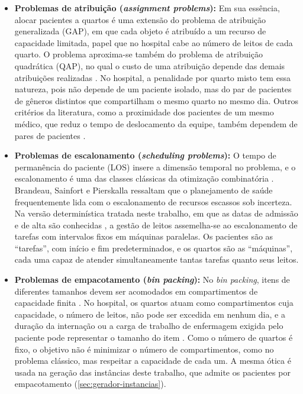 \begin{itemize}
    \item \textbf{Problemas de atribuição (\textit{assignment problems}):} Em sua essência, alocar pacientes a quartos é uma extensão do problema de atribuição generalizada (GAP), em que cada objeto é atribuído a um recurso de capacidade limitada, papel que no hospital cabe ao número de leitos de cada quarto. O problema aproxima-se também do problema de atribuição quadrática (QAP), no qual o custo de uma atribuição depende das demais atribuições realizadas \cite{talbi2009metaheuristics}. No hospital, a penalidade por quarto misto tem essa natureza, pois não depende de um paciente isolado, mas do par de pacientes de gêneros distintos que compartilham o mesmo quarto no mesmo dia. Outros critérios da literatura, como a proximidade dos pacientes de um mesmo médico, que reduz o tempo de deslocamento da equipe, também dependem de pares de pacientes \cite{schafer2023combining}.
    \item \textbf{Problemas de escalonamento (\textit{scheduling problems}):} O tempo de permanência do paciente (LOS) insere a dimensão temporal no problema, e o escalonamento é uma das classes clássicas da otimização combinatória \cite{talbi2009metaheuristics}. Brandeau, Sainfort e Pierskalla \cite{brandeau2004operations} ressaltam que o planejamento de saúde frequentemente lida com o escalonamento de recursos escassos sob incerteza. Na versão determinística tratada neste trabalho, em que as datas de admissão e de alta são conhecidas \cite{demeester2010hybrid}, a gestão de leitos assemelha-se ao escalonamento de tarefas com intervalos fixos em máquinas paralelas. Os pacientes são as ``tarefas'', com início e fim predeterminados, e os quartos são as ``máquinas'', cada uma capaz de atender simultaneamente tantas tarefas quanto seus leitos.
    \item \textbf{Problemas de empacotamento (\textit{bin packing}):} No \textit{bin packing}, itens de diferentes tamanhos devem ser acomodados em compartimentos de capacidade finita \cite{talbi2009metaheuristics}. No hospital, os quartos atuam como compartimentos cuja capacidade, o número de leitos, não pode ser excedida em nenhum dia, e a duração da internação ou a carga de trabalho de enfermagem exigida pelo paciente pode representar o tamanho do item \cite{belien2007building, talbi2009metaheuristics}. Como o número de quartos é fixo, o objetivo não é minimizar o número de compartimentos, como no problema clássico, mas respeitar a capacidade de cada um. A mesma ótica é usada na geração das instâncias deste trabalho, que admite os pacientes por empacotamento (\autoref{sec:gerador-instancias}).
\end{itemize}


